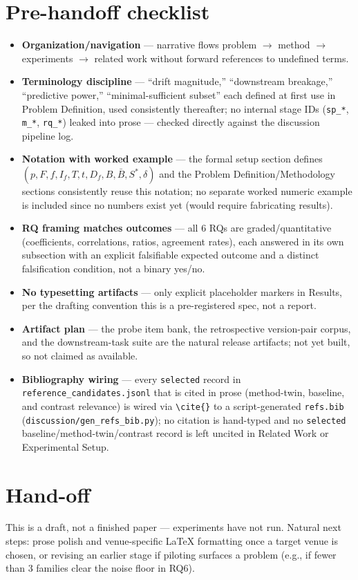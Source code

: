 \documentclass[11pt]{article}
\begin{document}
\section*{Pre-handoff checklist}
\begin{itemize}[leftmargin=1.4em]
\item \textbf{Organization/navigation} --- narrative flows problem $\to$ method $\to$ experiments $\to$ related work without forward references to undefined terms.
\item \textbf{Terminology discipline} --- ``drift magnitude,'' ``downstream breakage,'' ``predictive power,'' ``minimal-sufficient subset'' each defined at first use in Problem Definition, used consistently thereafter; no internal stage IDs (\texttt{sp\_*}, \texttt{m\_*}, \texttt{rq\_*}) leaked into prose --- checked directly against the discussion pipeline log.
\item \textbf{Notation with worked example} --- the formal setup section defines $(p, F, f, I_f, T, t, D_f, B, \bar{B}, S^*, \delta)$ and the Problem Definition/Methodology sections consistently reuse this notation; no separate worked numeric example is included since no numbers exist yet (would require fabricating results).
\item \textbf{RQ framing matches outcomes} --- all 6 RQs are graded/quantitative (coefficients, correlations, ratios, agreement rates), each answered in its own subsection with an explicit falsifiable expected outcome and a distinct falsification condition, not a binary yes/no.
\item \textbf{No typesetting artifacts} --- only explicit placeholder markers in Results, per the drafting convention this is a pre-registered spec, not a report.
\item \textbf{Artifact plan} --- the probe item bank, the retrospective version-pair corpus, and the downstream-task suite are the natural release artifacts; not yet built, so not claimed as available.
\item \textbf{Bibliography wiring} --- every \texttt{selected} record in \texttt{reference\_candidates.jsonl} that is cited in prose (method-twin, baseline, and contrast relevance) is wired via \texttt{\textbackslash cite\{\}} to a script-generated \texttt{refs.bib} (\texttt{discussion/gen\_refs\_bib.py}); no citation is hand-typed and no \texttt{selected} baseline/method-twin/contrast record is left uncited in Related Work or Experimental Setup.
\end{itemize}

\section*{Hand-off}
This is a draft, not a finished paper --- experiments have not run. Natural next steps: prose polish and venue-specific LaTeX formatting once a target venue is chosen, or revising an earlier stage if piloting surfaces a problem (e.g., if fewer than 3 families clear the noise floor in RQ6).



\end{document}
